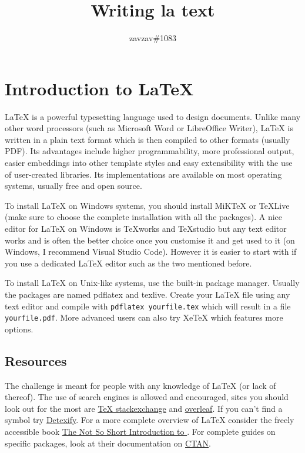 \documentclass[a4paper,beeees]{hwhProblem}
\begin{document}
\title{Writing la text}
\author{zavzav\#1083}
\date{}
\section*{Introduction to LaTeX}
\LaTeX{} is a powerful typesetting language used to design documents. Unlike many other word processors (such as Microsoft Word or LibreOffice Writer), \LaTeX{} is written in a plain text format which is then compiled to other formats (usually PDF). Its advantages include higher programmability, more professional output, easier embeddings into other template styles and easy extensibility with the use of user-created libraries. Its implementations are available on most operating systems, usually free and open source.

To install \LaTeX{} on Windows systems, you should install MiKTeX or TeXLive (make sure to choose the complete installation with all the packages). A nice editor for \LaTeX{} on Windows is TeXworks and TeXstudio but any text editor works and is often the better choice once you customise it and get used to it (on Windows, I recommend Visual Studio Code). However it is easier to start with if you use a dedicated \LaTeX{} editor such as the two mentioned before.

To install \LaTeX{} on Unix-like systems, use the built-in package manager. Usually the packages are named pdflatex and texlive. Create your \LaTeX{} file using any text editor and compile with \texttt{pdflatex yourfile.tex} which will result in a file \texttt{yourfile.pdf}. More advanced users can also try XeTeX which features more options.
\subsection*{Resources}
The challenge is meant for people with any knowledge of \LaTeX{} (or lack of thereof). The use of search engines is allowed and encouraged, sites you should look out for the most are \href{https://tex.stackexchange.com/}{\TeX{} stackexchange} and \href{https://www.overleaf.com/learn}{overleaf}. If you can't find a symbol try \href{http://detexify.kirelabs.org/classify.html}{Detexify}. For a more complete overview of \LaTeX{} consider the freely accessible book \href{https://tobi.oetiker.ch/lshort/lshort.pdf}{The Not So Short Introduction to \LaTeXe}. For complete guides on specific packages, look at their documentation on \href{https://ctan.org/}{CTAN}.
\end{document}
